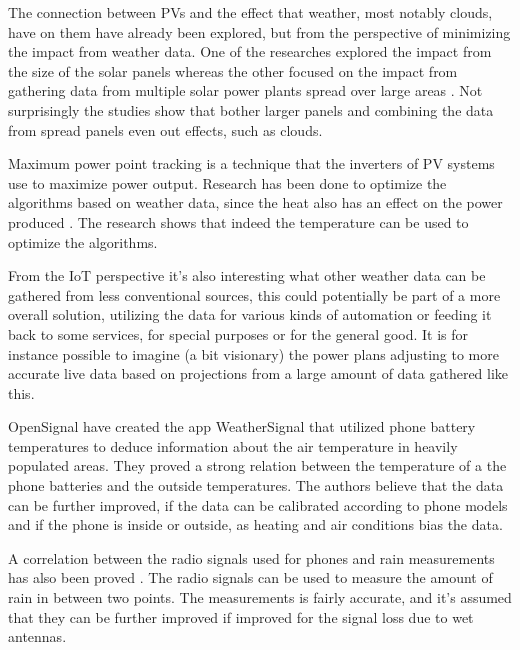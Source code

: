 The connection between PVs and the effect that weather, most notably
clouds, have on them have already been explored, but from the
perspective of minimizing the impact from weather data.  One of the
researches explored the impact from the size of the solar panels
\citep{cloudTrack} whereas the other focused on the impact from
gathering data from multiple solar power plants spread over large
areas \citep{southafrica}.  Not surprisingly the studies show that
bother larger panels and combining the data from spread panels even
out effects, such as clouds.

Maximum power point tracking is a technique that the inverters of PV
systems use to maximize power output.  Research has been done to
optimize the algorithms based on weather data, since the heat also has
an effect on the power produced \citep{mppt2004}.  The research shows
that indeed the temperature can be used to optimize the algorithms.

From the IoT perspective it's also interesting what other weather data
can be gathered from less conventional sources, this could potentially
be part of a more overall solution, utilizing the data for various
kinds of automation or feeding it back to some services, for special
purposes or for the general good.  It is for instance possible to
imagine (a bit visionary) the power plans adjusting to more accurate
live data based on projections from a large amount of data gathered
like this.

OpenSignal have created the app WeatherSignal that utilized phone
battery temperatures \citep{temperatures2013} to deduce information
about the air temperature in heavily populated areas.  They proved a
strong relation between the temperature of a the phone batteries and
the outside temperatures.  The authors believe that the data can be
further improved, if the data can be calibrated according to phone
models and if the phone is inside or outside, as heating and air
conditions bias the data.

A correlation between the radio signals used for phones and rain
measurements has also been proved \citep{rainfall2007}.  The radio
signals can be used to measure the amount of rain in between two
points.  The measurements is fairly accurate, and it's assumed that
they can be further improved if improved for the signal loss due to
wet antennas.

